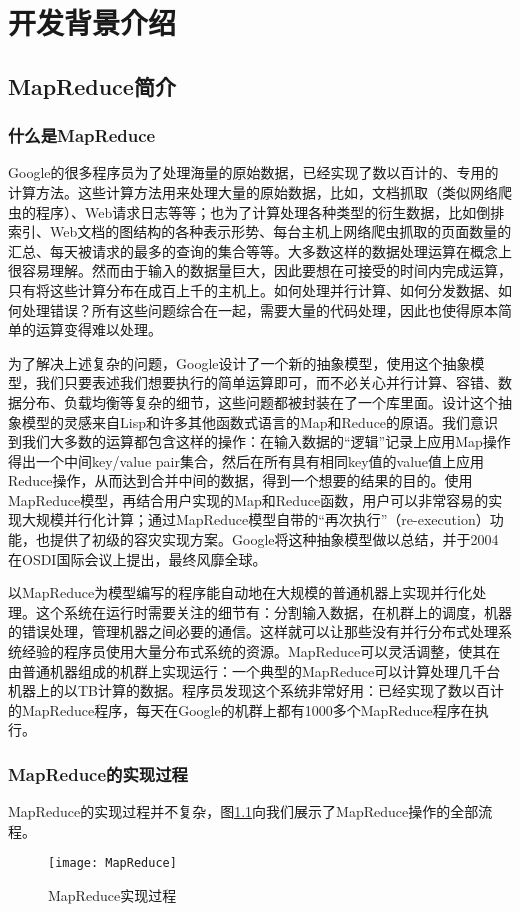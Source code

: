 \chapter{开发背景介绍}
\label{chap:2}

\section{MapReduce简介}
\subsection{什么是MapReduce}
Google的很多程序员为了处理海量的原始数据，已经实现了数以百计的、专用的计算方法。这些计算方法用来处理大量的原始数据，比如，文档抓取（类似网络爬虫的程序）、Web请求日志等等；也为了计算处理各种类型的衍生数据，比如倒排索引、Web文档的图结构的各种表示形势、每台主机上网络爬虫抓取的页面数量的汇总、每天被请求的最多的查询的集合等等。大多数这样的数据处理运算在概念上很容易理解。然而由于输入的数据量巨大，因此要想在可接受的时间内完成运算，只有将这些计算分布在成百上千的主机上。如何处理并行计算、如何分发数据、如何处理错误？所有这些问题综合在一起，需要大量的代码处理，因此也使得原本简单的运算变得难以处理。

为了解决上述复杂的问题，Google设计了一个新的抽象模型，使用这个抽象模型，我们只要表述我们想要执行的简单运算即可，而不必关心并行计算、容错、数据分布、负载均衡等复杂的细节，这些问题都被封装在了一个库里面。设计这个抽象模型的灵感来自Lisp和许多其他函数式语言的Map和Reduce的原语。我们意识到我们大多数的运算都包含这样的操作：在输入数据的“逻辑”记录上应用Map操作得出一个中间key/value pair集合，然后在所有具有相同key值的value值上应用Reduce操作，从而达到合并中间的数据，得到一个想要的结果的目的。使用MapReduce模型，再结合用户实现的Map和Reduce函数，用户可以非常容易的实现大规模并行化计算；通过MapReduce模型自带的“再次执行”（re-execution）功能，也提供了初级的容灾实现方案。Google将这种抽象模型做以总结，并于2004在OSDI国际会议上提出，最终风靡全球。

以MapReduce为模型编写的程序能自动地在大规模的普通机器上实现并行化处理。这个系统在运行时需要关注的细节有：分割输入数据，在机群上的调度，机器的错误处理，管理机器之间必要的通信。这样就可以让那些没有并行分布式处理系统经验的程序员使用大量分布式系统的资源。MapReduce可以灵活调整，使其在由普通机器组成的机群上实现运行：一个典型的MapReduce可以计算处理几千台机器上的以TB计算的数据。程序员发现这个系统非常好用：已经实现了数以百计的MapReduce程序，每天在Google的机群上都有1000多个MapReduce程序在执行。

\subsection{MapReduce的实现过程}
MapReduce的实现过程并不复杂，图\ref{fig:MapReduce}向我们展示了MapReduce操作的全部流程。
\begin{figure}
 \centering
 \texttt{[image: MapReduce]}
 \caption{MapReduce实现过程}
 \label{fig:MapReduce}
\end{figure}

